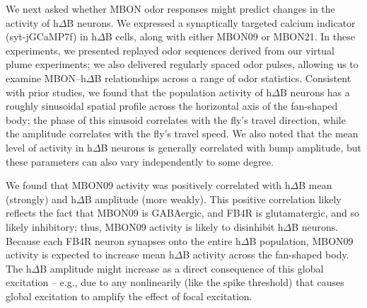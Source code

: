 We next asked whether MBON odor responses might predict changes in the  activity of h$\Delta$B neurons. We expressed a synaptically targeted calcium indicator (syt-jGCaMP7f) in h$\Delta$B cells, along with either MBON09 or MBON21. In these experiments, we presented replayed odor sequences derived from our virtual plume experiments; we also delivered regularly spaced odor pulses, allowing us to examine MBON–h$\Delta$B relationships across a range of odor statistics. Consistent with prior studies, we found that the population activity of h$\Delta$B neurons has a roughly sinusoidal spatial profile across the horizontal axis of the fan-shaped body; the phase of this sinusoid correlates with the fly’s travel direction, while the amplitude correlates with the fly’s travel speed. We also noted that the mean level of activity in h$\Delta$B neurons is generally correlated with bump amplitude, but these parameters can also vary independently to some degree. 

We found that MBON09 activity was positively correlated with h$\Delta$B mean (strongly) and h$\Delta$B amplitude (more weakly). This positive correlation likely reflects the fact that MBON09 is GABAergic, and FB4R is glutamatergic, and so likely inhibitory; thus, MBON09 activity is likely to disinhibit h$\Delta$B neurons. Because each FB4R neuron synapses onto the entire h$\Delta$B population, MBON09 activity is expected to increase mean h$\Delta$B activity across the fan-shaped body. The h$\Delta$B amplitude might increase as a direct consequence of this global excitation -- e.g., due to any nonlinearily (like the spike threshold) that causes global excitation to amplify the effect of focal excitation.

